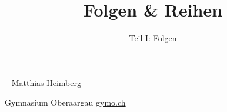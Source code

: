 \documentclass[justified,openany,nofonts]{tufte-book}
\title{Folgen \& Reihen}
\author{Teil I: Folgen}
\begin{document}
\maketitle



\begin{fullwidth}
~\vfill
\thispagestyle{empty}
\setlength{\parindent}{0pt}
\setlength{\parskip}{\baselineskip}
Matthias Heimberg

Gymnasium Oberaargau \url{gymo.ch}



\end{fullwidth}











\setcounter{chapter}{0}







%
%

\printindex
\end{document}
